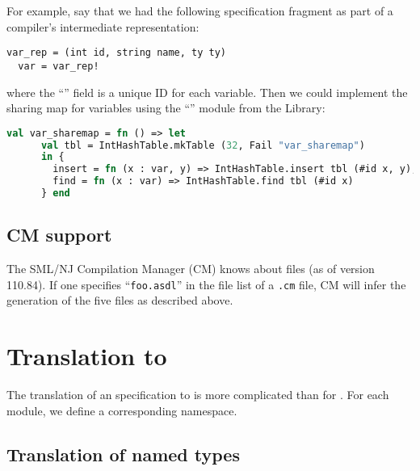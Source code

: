 For example, say that we had the following \asdl{} specification fragment
as part of a compiler's intermediate representation:
\begin{code}
\begin{lstlisting}[language=asdl]
  var_rep = (int id, string name, ty ty)
  var = var_rep!
\end{lstlisting}%
\end{code}%
where the ``'' field is a unique ID for each variable.
Then we could implement the sharing map for variables using the
``'' module from the \smlnj{} Library:
\begin{code}
\begin{lstlisting}[language=sml]
val var_sharemap = fn () => let
      val tbl = IntHashTable.mkTable (32, Fail "var_sharemap")
      in {
        insert = fn (x : var, y) => IntHashTable.insert tbl (#id x, y),
        find = fn (x : var) => IntHashTable.find tbl (#id x)
      } end
\end{lstlisting}%
\end{code}%

\subsection{CM support}
The SML/NJ Compilation Manager (CM) knows about \asdl{} files (as of version 110.84).
If one specifies ``\texttt{foo.asdl}'' in the file list of a \texttt{.cm} file, CM will
infer the generation of the five \sml{} files as described above.

\section{Translation to \Cplusplus{}}

The translation of an \asdl{} specification to \Cplusplus{} is more complicated than for \sml{}.
For each \asdl{} module, we define a corresponding \Cplusplus{} namespace.

\subsection{Translation of named types}

